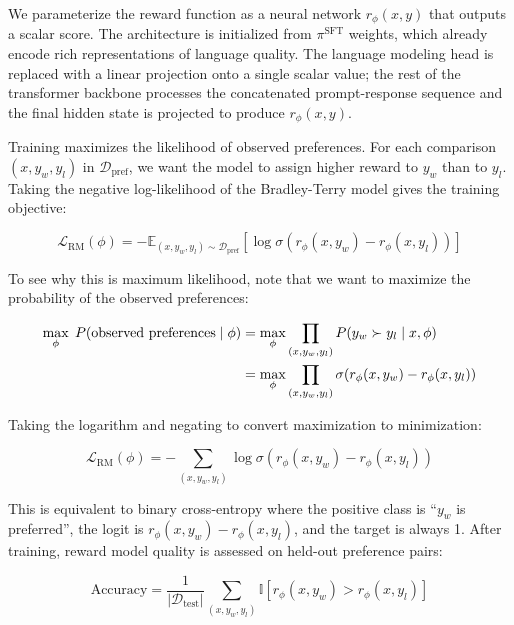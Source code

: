 \documentclass{book}
\begin{document}
We parameterize the reward function as a neural network $r_\phi(x, y)$
that outputs a scalar score. The architecture is initialized from
$\pi^{\text{SFT}}$ weights, which already encode rich representations of
language quality. The language modeling head is replaced with a linear
projection onto a single scalar value; the rest of the transformer
backbone processes the concatenated prompt-response sequence and the
final hidden state is projected to produce $r_\phi(x, y)$.

Training maximizes the likelihood of observed preferences. For each
comparison $(x, y_w, y_l)$ in $\mathcal{D}_{\text{pref}}$, we want the
model to assign higher reward to $y_w$ than to $y_l$. Taking the negative
log-likelihood of the Bradley-Terry model gives the training objective:

\begin{equation}
\label{eq:rm_loss}
\mathcal{L}_{\text{RM}}(\phi)
= -\mathbb{E}_{(x, y_w, y_l) \sim \mathcal{D}_{\text{pref}}}
    \left[ \log \sigma(r_\phi(x, y_w) - r_\phi(x, y_l)) \right]
\end{equation}

To see why this is maximum likelihood, note that we want to maximize the
probability of the observed preferences:

\begin{align}
\label{eq:rm_mle}
\max_\phi\; P(\text{observed preferences} \mid \phi)
&= \max_\phi \prod_{(x,y_w,y_l)} P(y_w \succ y_l \mid x, \phi) \notag \\
&= \max_\phi \prod_{(x,y_w,y_l)}
    \sigma(r_\phi(x, y_w) - r_\phi(x, y_l))
\end{align}

Taking the logarithm and negating to convert maximization to minimization:

\begin{equation}
\label{eq:rm_loss_derived}
\mathcal{L}_{\text{RM}}(\phi)
= -\sum_{(x,y_w,y_l)}
    \log \sigma(r_\phi(x, y_w) - r_\phi(x, y_l))
\end{equation}

This is equivalent to binary cross-entropy where the positive class is
``$y_w$ is preferred'', the logit is $r_\phi(x, y_w) - r_\phi(x, y_l)$,
and the target is always 1. After training, reward model quality is
assessed on held-out preference pairs:

\begin{equation}
\label{eq:rm_accuracy}
\text{Accuracy}
= \frac{1}{|\mathcal{D}_{\text{test}}|}
    \sum_{(x, y_w, y_l)} \mathbb{I}[r_\phi(x, y_w) > r_\phi(x, y_l)]
\end{equation}
\end{document}
